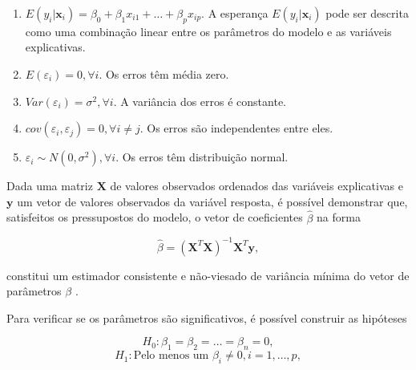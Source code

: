 \begin{enumerate}
    \item $E(y_i|\mathbf{x}_i) = \beta_0 + \beta_1 x_{i1} + \dots + \beta_p x_{ip}$. A esperança $E(y_i|\mathbf{x}_i)$ pode ser descrita como uma combinação linear entre os parâmetros do modelo e as variáveis explicativas.
    \item $E(\varepsilon_i) = 0, \forall i$. Os erros têm média zero.
    \item $Var(\varepsilon_i) = \sigma^2, \forall i$. A variância dos erros é constante.
    \item $cov(\varepsilon_i, \varepsilon_j) = 0, \forall i \neq j$. Os erros são independentes entre eles.
    \item $\varepsilon_i \sim N(0, \sigma^2), \forall i$. Os erros têm distribuição normal.
\end{enumerate}



Dada uma matriz $\mathbf{X}$  de valores observados ordenados das variáveis explicativas e $\mathbf{y}$ um vetor de valores observados da variável resposta, é possível demonstrar que, satisfeitos os pressupostos do modelo, o vetor de coeficientes $\hat{\beta}$ na forma

\begin{equation}
\hat{\beta} = (\mathbf{X}^{T}\mathbf{X})^{-1} \mathbf{X}^{T} \mathbf{y},
\end{equation}

\noindent constitui um estimador consistente e não-viesado de variância mínima do vetor de parâmetros $\beta$ \cite{kutner}.

Para verificar se os parâmetros são significativos, é possível construir as hipóteses

$$H_0: \beta_1 = \beta_2 = \dots = \beta_n = 0,$$
$$H_1: \text{Pelo menos um } \beta_i \neq 0, i = {1, \dots, p},$$

